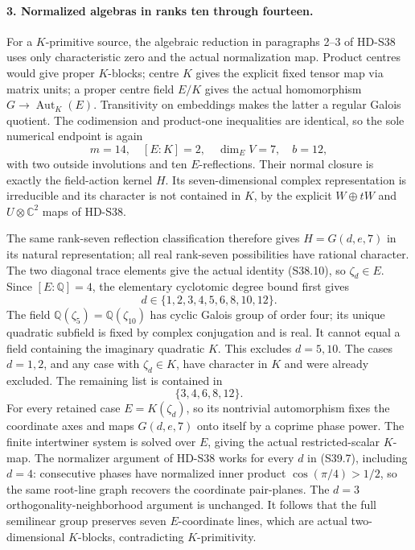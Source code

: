 \paragraph{3. Normalized algebras in ranks ten through fourteen.}
For a \(K\)-primitive source, the algebraic reduction in
paragraphs 2--3 of HD-S38 uses only characteristic zero and the
actual normalization map. Product centres would give proper
\(K\)-blocks; centre \(K\) gives the explicit fixed tensor
map via matrix units; a proper centre field \(E/K\) gives
the actual homomorphism \(G\to\operatorname{Aut}_K(E)\).
Transitivity on embeddings makes the latter a regular Galois
quotient. The codimension and product-one inequalities are
identical, so the sole numerical endpoint is again
\[
       m=14,\quad[E:K]=2,\quad \dim_E V=7,\quad b=12,
                                                               \tag{S39.5}
\]
with two outside involutions and ten \(E\)-reflections.
Their normal closure is exactly the field-action kernel \(H\).
Its seven-dimensional complex representation is irreducible and
its character is not contained in \(K\), by the explicit
\(W\oplus tW\) and \(U\otimes\mathbb C^2\) maps of HD-S38.

The same rank-seven reflection classification therefore gives
\(H=G(d,e,7)\) in its natural representation; all real
rank-seven possibilities have rational character. The two
diagonal trace elements give the actual identity (S38.10),
so \(\zeta_d\in E\). Since \([E:\mathbb Q]=4\),
the elementary cyclotomic degree bound first gives
\[
                    d\in\{1,2,3,4,5,6,8,10,12\}.           \tag{S39.6}
\]
The field \(\mathbb Q(\zeta_5)=\mathbb Q(\zeta_{10})\)
has cyclic Galois group of order four; its unique quadratic
subfield is fixed by complex conjugation and is real. It
cannot equal a field containing the imaginary quadratic \(K\).
This excludes \(d=5,10\). The cases \(d=1,2\), and any
case with \(\zeta_d\in K\), have character in \(K\)
and were already excluded. The remaining list is contained in
\[
                             \{3,4,6,8,12\}.                \tag{S39.7}
\]
For every retained case \(E=K(\zeta_d)\), so its
nontrivial automorphism fixes the coordinate axes and maps
\(G(d,e,7)\) onto itself by a coprime phase power.
The finite intertwiner system is solved over \(E\), giving
the actual restricted-scalar \(K\)-map. The normalizer
argument of HD-S38 works for every \(d\) in (S39.7),
including \(d=4\): consecutive phases have normalized
inner product \(\cos(\pi/4)>1/2\), so the same root-line
graph recovers the coordinate pair-planes. The \(d=3\)
orthogonality-neighborhood argument is unchanged.
It follows that the full semilinear group preserves seven
\(E\)-coordinate lines, which are actual two-dimensional
\(K\)-blocks, contradicting \(K\)-primitivity.

